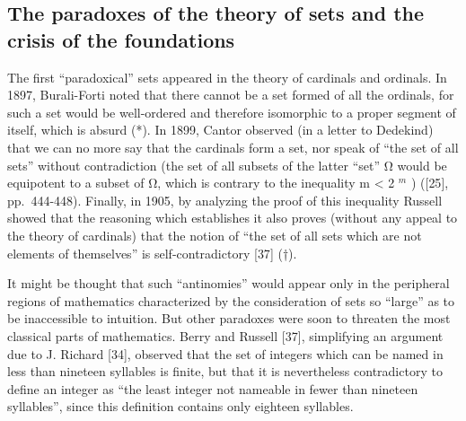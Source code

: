 \subsection*{The paradoxes of the theory of sets and the crisis of the foundations}

The first ``paradoxical'' sets appeared in the theory of cardinals and ordinals. In 1897, Burali-Forti noted that there cannot be a set formed of all the ordinals, for such a set would be well-ordered and therefore isomorphic to a proper segment of itself, which is absurd (*). In 1899, Cantor observed (in a letter to Dedekind) that we can no more say that the cardinals form a set, nor speak of ``the set of all sets'' without contradiction (the set of all subsets of the latter ``set'' Ω would be equipotent to a subset of Ω, which is contrary to the inequality m \textless{} 2 \(^{m}\) ) ({[}25{]}, pp.~444-448). Finally, in 1905, by analyzing the proof of this inequality Russell showed that the reasoning which establishes it also proves (without any appeal to the theory of cardinals) that the notion of ``the set of all sets which are not elements of themselves'' is self-contradictory {[}37{]} (†).

It might be thought that such ``antinomies'' would appear only in the peripheral regions of mathematics characterized by the consideration of sets so ``large'' as to be inaccessible to intuition. But other paradoxes were soon to threaten the most classical parts of mathematics. Berry and Russell {[}37{]}, simplifying an argument due to J. Richard {[}34{]}, observed that the set of integers which can be named in less than nineteen syllables is finite, but that it is nevertheless contradictory to define an integer as ``the least integer not nameable in fewer than nineteen syllables'', since this definition contains only eighteen syllables.

